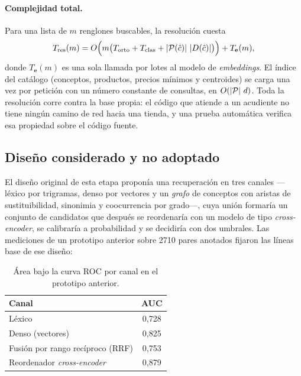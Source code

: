 \paragraph{Complejidad total.} Para una lista de $m$ renglones buscables, la
resolución cuesta
\[
  T_{\mathrm{res}}(m)=O\Bigl(m\bigl(T_{\mathrm{orto}}+T_{\mathrm{clas}}+\left\lvert \mathcal{P}(\hat c) \right\rvert\,\left\lvert D(\hat c) \right\rvert\bigr)\Bigr)
  + T_{\mathbf{e}}(m),
\]
donde $T_{\mathbf{e}}(m)$ es una sola llamada por lotes al modelo de
\emph{embeddings}. El índice del catálogo (conceptos, productos, precios
mínimos y centroides) se carga una vez por petición con un número constante de
consultas, en $O(\left\lvert \mathcal{P} \right\rvert\,d)$. Toda la resolución corre contra la base
propia: el código que atiende a un acudiente no tiene ningún camino de red
hacia una tienda, y una prueba automática verifica esa propiedad sobre el
código fuente.

\subsection{Diseño considerado y no adoptado}
\label{sec:res-alternativas}

El diseño original de esta etapa proponía una recuperación en tres canales
---léxico por trigramas, denso por vectores y un \emph{grafo} de conceptos con
aristas de sustituibilidad, sinonimia y coocurrencia por grado---, cuya
unión formaría un conjunto de candidatos que después se reordenaría con un
modelo de tipo \emph{cross-encoder}, se calibraría a probabilidad y se
decidiría con dos umbrales. Las mediciones de un prototipo anterior sobre
\num{2710} pares anotados fijaron las líneas base de ese diseño:

\begin{table}[htbp]
\centering\small
\caption{Área bajo la curva ROC por canal en el prototipo anterior.}
\label{tab:auc-prototipo}
\begin{tabular}{@{}lc@{}}
\toprule
Canal & AUC \\
\midrule
Léxico & 0,728 \\
Denso (vectores) & 0,825 \\
Fusión por rango recíproco (RRF) & 0,753 \\
Reordenador \emph{cross-encoder} & 0,879 \\
\bottomrule
\end{tabular}
\end{table}

